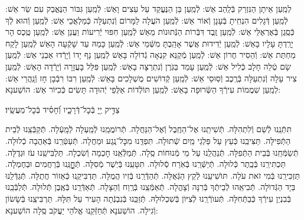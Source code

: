 \documentclass[twoside, openany, parskip=half, 11pt]{book}
\begin{document}
\begin{sometimes}
לְמַֽעַן אֵיתָן הַנִּזְרַק בְּֿלַֽהַב אֵשׁ: לְֿמַֽעַן בֵּן הַנֶּעֱקַד עַל עֵצִים וָאֵשׁ: לְֿמַֽעַן גִּבּוֹר הַנֶּאֱבַק עִם שַׂר אֵשׁ: לְֿמַֽעַן דְּֿגָלִים הִנְחִֽיתָ בְּֿעָנָן וְֿאוֹר אֵשׁ: לְֿמַֽעַן הֹעֲלָה לַמָּרוֹם וְֿנִתְעַלָּה כְּֿמַלְאֲכֵי אֵשׁ: לְֿמַֽעַן וְֿהוּא לְֿךָ כְּֿסֶֽגֶן בְּֿאֶרְאֶלֵּי אֵשׁ: לְֿמַֽעַן זֶֽבֶד דִּבְּֿרוֹת הַנְּֿתוּנוֹת מֵאֵשׁ לְֿמַֽעַן חִפּוּי יְֿרִיעוֹת וַעֲנַן אֵשׁ: לְֿמַֽעַן טֶֽכֶס הָר יָרַֽדְתָּ עָלָיו בָּאֵשׁ: לְֿמַֽעַן יְֿדִידוּת אֲשֶׁר אָהַֽבְתָּ מִשְּֿׁמֵי אֵשׁ: לְֿמַֽעַן כָּמַהּ עַד שָׁקְֿעָה הָאֵשׁ לְֿמַֽעַן לָקַח מַחְתַּת אֵשׁ: וְֿהֵסִיר חֲרוֹן אֵשׁ: לְֿמַֽעַן מְֿקַנֵּא קִנְאָה גְֿדוֹלָה בָּאֵשׁ לְֿמַֽעַן נָף יָדוֹ וְֿיָרְֿדוּ אַבְנֵי אֵשׁ: לְֿמַֽעַן שָׂם טְֿלֵה חָלָב כְּֿלִיל אֵשׁ: לְֿמַֽעַן עָמַד בַּגֹּֽרֶן וְֿנִתְרַצָּה בָאֵשׁ: לְֿמַֽעַן פִּלֵּל בָּעֲזָרָה וְֿיָרְֿדָה הָאֵשׁ: לְֿמַֽעַן צִיר עָלָה וְֿנִתְעַלָּה בְּֿרֶֽכֶב וְֿסֽוּסֵי אֵשׁ: לְֿמַֽעַן קְֿדוֹשִׁים מֻשְׁלָכִים בָּאֵשׁ: לְֿמַֽעַן רִבּוֹ רִבְֿבָן חָז וְֿנַֽהֲרֵי אֵשׁ:
לְמַֽעַן שִׁמֲמוֹת עִירְֿךָ הַשְּֿׂרוּפָה בָאֵשׁ:
 לְֿמַֽעַן תּוֹלְֿדוֹת אַלֻּפֵי יְֿהוּדָה תָּשִׂים כְּֿכִיּוֹר אֵשׁ: הוֹשַׁענָא:

 צַדִּ֣יק יְ֖יָ בְּֿכׇל־דְּֿרָכָ֑יו וְֿ֝חָסִ֗יד בְּֿכׇל־מַעֲשָֽׂיו׃

תִּתְּֿנֵֽנוּ לְֿשֵׁם וְֿלִתְהִלָּה.
 תְּֿשִׁיתֵֽנוּ אֶל־הַחֶֽבֶל וְֿאֶל־הַנַּחֲלָה.
 תְּֿרוֹמֲמֵֽנוּ לְֿמַֽעְלָה לְֿמָֽעְֿלָה.
תְּֿקַבְּֿצֵֽנוּ לְֿבֵית הַתְּֿפִילָּה.
 תַּצִּיבֵֽנוּ כְּֿעֵץ עַל פַּלְגֵי מַֽיִם שְֿׁתוּלָה.
 תִּפְדֵּֽנוּ מִכׇּל־נֶֽגַע וּמַחֲלָה.
 תְּֿעַטְּֿרֵֽנוּ בְּֿאַהֲבָה כְֿלוּלָה.
 תְּֿשַׂמְּֿחֵֽנוּ בְּֿבֵית הַתְּֿפִלָּה.
 תְּֿנַהֲלֵֽנוּ עַל מֵי מְֿנוּחוֹת סֶֽלָה.
 תְּֿמַלְּֿאֵֽנוּ חׇכְמָה וְֿשִׂכְלָה.
 תַּלְבִּישֵֽׁנוּ עֹז וּגְדֻלָּה.
 תַּכְתִּירֵֽנוּ בְּֿכֶֽתֶר כְּֿלוּלָה.
 תְּֿיַשְּֿׁרֵֽנוּ בְּֿאֹֽרַח סְֿלוּלָה.
 תִּטָּעֵֽנוּ בְּֿיֹֽשֶׁר מְֿסִלָּה.
 תְּֿחׇׇׇׇׇׇׇׇָנֵּֽנוּ בְּֿרַחֲמִים וּבְחֶמְלָה.
 תַּזְכִּירֵֽנוּ בְּֿמִי זֹאת עֹלָה.
תּוׂשִׁיעֵֽנוּ לְֿקֵץ הַגְּֿאֻלָּה.
 תְּֿהַדְּֿרֵֽנוּ בְּֿזִיו הֲמֻלָּה.
תַּדְבִּיקֵֽנוּ כְּֿאֵזוֹר חֲתֻלָּה.
תְּֿגַדְּֿלֵֽנוּ בַּיָד הַגְּֿדוׂלָה.
 תְּֿבִיאֵֽהוּ לְֿבֵיתְֿךָ בְּֿרִנָּה וְֿצָהֳלָה.
 תְּֿאַמְּֿצֵֽנוּ בְּֿרֶֽוַח וְֿהַצָּלָה.
תְּֿאַדְּֿרְֵנוּ בְּֿאֶֽבֶן תְּֿלוּלָה.
 תְּֿלַבְּֿבֵֽנוּ בְּֿבִנְיַן עִירְֿךָ כְּֿבַתְּֿחִלָּה.
תְּֿעוׂרְֿרֵֽנוּ לְֿצִיּוׂן בְּֿשִׁכְלוּלָהּ.
תְּֿזַכְֵּנוּ בְּֿנִבְנְֿתָה הָעִיר עַל תִּלָּהּ.
תַּרְבִּיצֵֽנוּ בְּֿשָׂשׂוֹן וְֿגִילָה.
 הוֹשַׁענָא תְּֿחַזְּֿקֵֽנוּ אֱלֹהֵי יַעֲקֹב סֶֽלָה הוֹשַׁענָא:


\end{sometimes}
\end{document}
